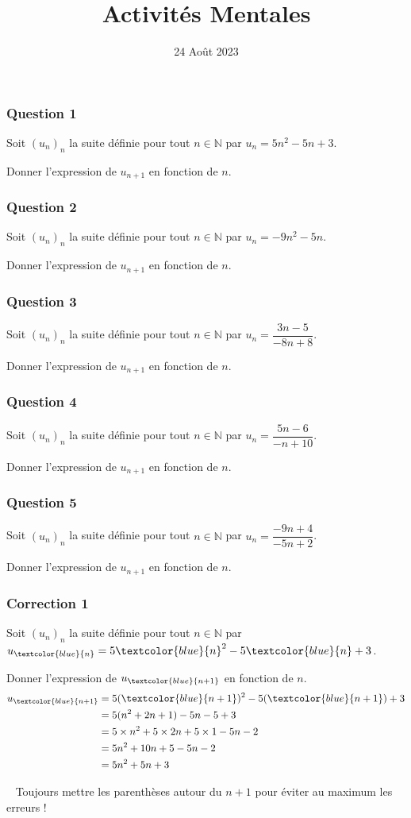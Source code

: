 \documentclass[15pt, mathserif]{beamer}
\title{Activités Mentales}
\date{24 Août 2023}
\newcommand{\N}{\mathbb{N}}			%
\begin{document}
\begin{frame}
    \titlepage
\end{frame}

\begin{frame} 
	\frametitle{Question 1}
Soit $(u_n)_n$ la suite définie pour tout $n \in \N$ par $u_n=5n^2-5n+3$. 
 
 Donner l'expression de $u_{n+1}$ en fonction de $n$.\end{frame}


\begin{frame} 
	\frametitle{Question 2}
Soit $(u_n)_n$ la suite définie pour tout $n \in \N$ par $u_n=-9n^2-5n$. 
 
 Donner l'expression de $u_{n+1}$ en fonction de $n$.\end{frame}


\begin{frame} 
	\frametitle{Question 3}
Soit $(u_n)_n$ la suite définie pour tout $n \in \N$ par $u_n=\dfrac{3n-5}{-8n+8}$. 
 
 Donner l'expression de $u_{n+1}$ en fonction de $n$.\end{frame}


\begin{frame} 
	\frametitle{Question 4}
Soit $(u_n)_n$ la suite définie pour tout $n \in \N$ par $u_n=\dfrac{5n-6}{-n+10}$. 
 
 Donner l'expression de $u_{n+1}$ en fonction de $n$.\end{frame}


\begin{frame} 
	\frametitle{Question 5}
Soit $(u_n)_n$ la suite définie pour tout $n \in \N$ par $u_n=\dfrac{-9n+4}{-5n+2}$. 
 
 Donner l'expression de $u_{n+1}$ en fonction de $n$.\end{frame}


\begin{frame}
\vspace{-10mm}
	\frametitle{Correction 1}
Soit $(u_n)_n$ la suite définie pour tout $n \in \N$ par $u_{\textcolor{blue}{n}}=5\textcolor{blue}{n}^2-5\textcolor{blue}{n}+3$. 
 
 Donner l'expression de $u_{\textcolor{blue}{n+1}}$ en fonction de $n$. \begin{align*} u_{\textcolor{blue}{n+1}}&=5(\textcolor{blue}{n+1})^2-5(\textcolor{blue}{n+1})+3\\ &=5(n^2+2n+1)-5n-5+3\\ &=5\times n^2+5 \times 2n+5\times 1-5n-2\\ &=5n^2+10n+5-5n-2\\ &=5n^2+5n+3\end{align*} 
 
 \bcattention ~ Toujours mettre les parenthèses autour du $n+1$ pour éviter au maximum les erreurs !\end{frame}
\end{document}
